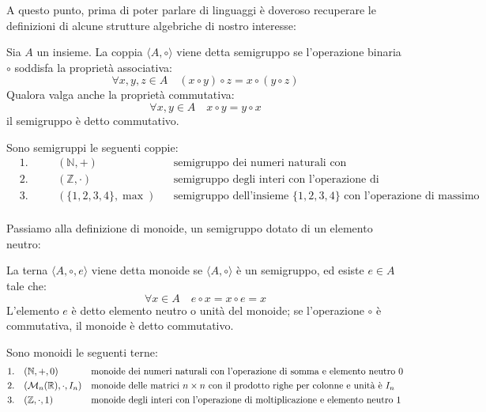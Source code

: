 \documentclass{article}
\begin{document}
\noindent
A questo punto, prima di poter parlare di linguaggi è doveroso recuperare le definizioni di alcune strutture algebriche di nostro interesse:\newline
\noindent
\begin{definition} 
Sia $A$ un insieme. La coppia $\langle A, \circ \rangle$ viene detta semigruppo se l’operazione binaria $\circ$ soddisfa la proprietà associativa:
\[ \forall x, y, z \in A \quad (x \circ y) \circ z = x \circ (y \circ z) \]
Qualora valga anche la proprietà commutativa:
\[ \forall x, y \in A \quad x \circ y = y \circ x \]
il semigruppo è detto commutativo.
\end{definition}
\begin{example}
Sono semigruppi le seguenti coppie:
\begin{align*}
    &\text{1.} \quad && (\mathbb{N}, +) && \text{semigruppo dei numeri naturali con l'operazione di somma} \\
    &\text{2.} \quad && (\mathbb{Z}, \cdot) && \text{semigruppo degli interi con l'operazione di moltiplicazione} \\
    &\text{3.} \quad && (\{1, 2, 3, 4\}, \max) && \text{semigruppo dell'insieme \(\{1, 2, 3, 4\}\) con l'operazione di massimo} \\
\end{align*}
\end{example}
\noindent Passiamo alla definizione di monoide, un semigruppo dotato di un elemento neutro:
\\\noindent
\begin{definition}
La terna $\langle A, \circ, e \rangle$ viene detta monoide se $\langle A, \circ \rangle$ è un semigruppo, ed esiste $e \in A$ tale che:
\[ \forall x \in A \quad e \circ x = x \circ e = x \]
L’elemento $e$ è detto elemento neutro o unità del monoide; se l’operazione $\circ$ è commutativa, il monoide è detto commutativo.
\end{definition}
\begin{example}
Sono monoidi le seguenti terne:
\begin{align*}
    &\text{1.} && (\mathbb{N}, +, 0) && \text{monoide dei numeri naturali con l'operazione di somma e elemento neutro 0} \\
    &\text{2.} && (\mathcal{M}_n(\mathbb{R}), \cdot, I_n) && \text{monoide delle matrici \( n \times n \) con il prodotto righe per colonne e unità è \( I_n \)} \\
    &\text{3.} && (\mathbb{Z}, \cdot, 1) && \text{monoide degli interi con l'operazione di moltiplicazione e elemento neutro 1}
\end{align*}
\end{example}
\end{document}

